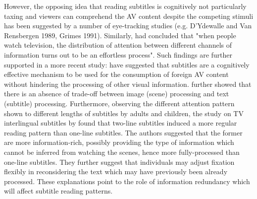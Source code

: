 \documentclass[output=paper]{langsci/langscibook}
\begin{document}
However, the opposing idea that reading subtitles is cognitively not particularly taxing and viewers can comprehend the AV content despite the competing stimuli has been suggested by a number of eye-tracking studies (e.g. D'Ydewalle and Van Rensbergen 1989, Grimes 1991). Similarly, \citet[p. 425]{dydewalle1992} had concluded that "when people watch television, the distribution of attention between different channels of information turns out to be an effortless process". Such findings are further supported in a more recent study: \citet{perego2010} have suggested that subtitles are a cognitively effective mechanism to be used for the consumption of foreign AV content without hindering the processing of other visual information. \citet{perego2010} further showed that there is an absence of trade-off between image (scene) processing and text (subtitle) processing. Furthermore, observing the different attention pattern shown to different lengths of subtitles by adults and children, the study on TV interlingual subtitles by \citet{Bruycker2007} found that two-line subtitles induced a more regular reading pattern than one-line subtitles. The authors suggested that the former are more information-rich, possibly providing the type of information which cannot be inferred from watching the scenes, hence more fully-processed than one-line subtitles. They further suggest that individuals may adjust fixation flexibly in reconsidering the text which may have previously been already processed.  These explanations point to the role of information redundancy which will affect subtitle reading patterns.
\end{document}
